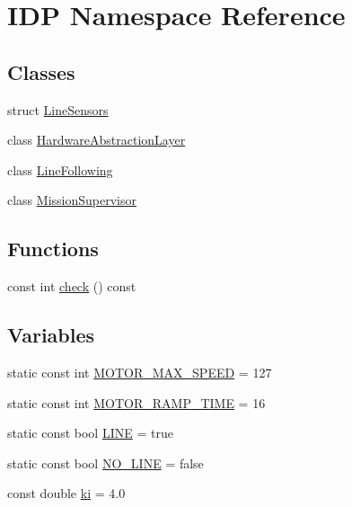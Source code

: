 \hypertarget{namespaceIDP}{
\section{IDP Namespace Reference}
\label{namespaceIDP}
}
\subsection*{Classes}
\begin{DoxyCompactItemize}
\item 
struct \hyperlink{structIDP_1_1LineSensors}{LineSensors}
\item 
class \hyperlink{classIDP_1_1HardwareAbstractionLayer}{HardwareAbstractionLayer}
\item 
class \hyperlink{classIDP_1_1LineFollowing}{LineFollowing}
\item 
class \hyperlink{classIDP_1_1MissionSupervisor}{MissionSupervisor}
\end{DoxyCompactItemize}
\subsection*{Functions}
\begin{DoxyCompactItemize}
\item 
const int \hyperlink{namespaceIDP_a3300f0a24143e1251336837f84151aaa}{check} () const 
\end{DoxyCompactItemize}
\subsection*{Variables}
\begin{DoxyCompactItemize}
\item 
static const int \hyperlink{namespaceIDP_a4ead0b21ad2c507b542445695182d4cd}{MOTOR\_\-MAX\_\-SPEED} = 127
\item 
static const int \hyperlink{namespaceIDP_ab3a00a6cc8a6dba271e38d337daf4703}{MOTOR\_\-RAMP\_\-TIME} = 16
\item 
static const bool \hyperlink{namespaceIDP_a559427fa7c37f2edc0a43a4b793c4fdc}{LINE} = true
\item 
static const bool \hyperlink{namespaceIDP_a5ea027b77276a637783f68955303b9b8}{NO\_\-LINE} = false
\item 
const double \hyperlink{namespaceIDP_aa2b933f600179026dbca5d8bc63c3baf}{ki} = 4.0
\end{DoxyCompactItemize}


